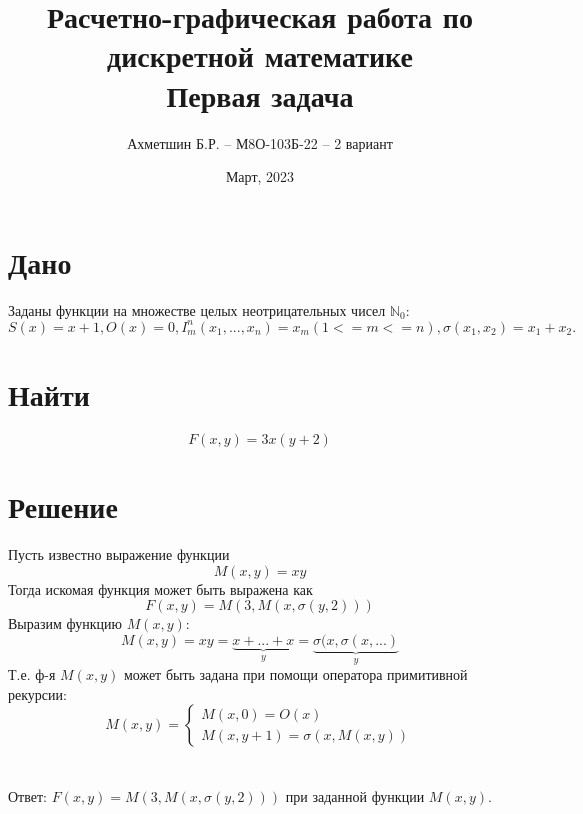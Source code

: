 \documentclass{article}
\title{Расчетно-графическая работа по дискретной математике\\Первая задача}
\author{Ахметшин Б.Р. -- М8О-103Б-22 -- 2 вариант}
\date{Март, 2023}
\begin{document}
\maketitle

\section*{Дано}
Заданы функции на множестве целых неотрицательных чисел $\mathbb{N}_0$:
\[S(x) = x + 1, O(x) = 0, I^n_m(x_1, ..., x_n) = x_m (1 <= m <= n), \sigma(x_1, x_2) = x_1 + x_2.\]
\section*{Найти}
\[F(x,y) = 3x(y+2)\]

\section*{Решение}
Пусть известно выражение функции \[M(x,y) = xy\]
Тогда искомая функция может быть выражена как \[F(x,y) = M(3,M(x,\sigma(y,2)))\]
Выразим функцию $M(x,y)$:
\[M(x,y) = xy = \underbrace{x + ... + x}_{y}=\underbrace{\sigma(x,\sigma(x,...)}_{y}\]
Т.е. ф-я $M(x,y)$ может быть задана при помощи оператора примитивной рекурсии:
\[
M(x,y) =
\begin{cases}
  M(x,0)=O(x)\\
  M(x,y+1)=\sigma(x, M(x,y))
\end{cases}
\]
\\\\
Ответ: $F(x,y)=M(3,M(x,\sigma(y,2)))$ при заданной функции $M(x,y)$.
\end{document}
